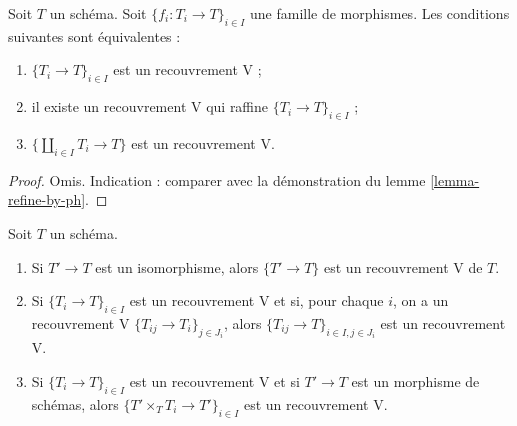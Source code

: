 \begin{lemma}
\label{lemma-refine-by-V}
Soit $T$ un schéma. Soit $\{f_i : T_i \to T\}_{i \in I}$ une famille
de morphismes. Les conditions suivantes sont équivalentes :
\begin{enumerate}
\item $\{T_i \to T\}_{i \in I}$ est un recouvrement V ;
\item il existe un recouvrement V qui raffine $\{T_i \to T\}_{i \in I}$ ;
\item $\{\coprod_{i \in I} T_i \to T\}$ est un recouvrement V.
\end{enumerate}
\end{lemma}

\begin{proof}
Omis. Indication : comparer avec la démonstration du
lemme \ref{lemma-refine-by-ph}.
\end{proof}

\begin{lemma}
\label{lemma-V}
Soit $T$ un schéma.
\begin{enumerate}
\item Si $T' \to T$ est un isomorphisme, alors $\{T' \to T\}$
est un recouvrement V de $T$.
\item Si $\{T_i \to T\}_{i\in I}$ est un recouvrement V et si, pour chaque
$i$, on a un recouvrement V $\{T_{ij} \to T_i\}_{j\in J_i}$, alors
$\{T_{ij} \to T\}_{i \in I, j\in J_i}$ est un recouvrement V.
\item Si $\{T_i \to T\}_{i\in I}$ est un recouvrement V
et si $T' \to T$ est un morphisme de schémas, alors
$\{T' \times_T T_i \to T'\}_{i\in I}$ est un recouvrement V.
\end{enumerate}
\end{lemma}

